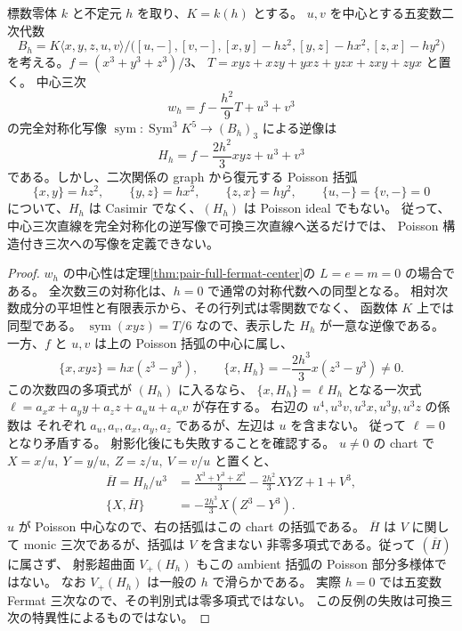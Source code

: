 \begin{proposition}[中心三次の対称化逆像は一般にPoisson超曲面を与えない]
\label{prop:poisson-naive-symmetrization-fails}
標数零体 $k$ と不定元 $h$ を取り、$K=k(h)$ とする。
$u,v$ を中心とする五変数二次代数
\[
 B_h=K\langle x,y,z,u,v\rangle/
 \bigl([u,-],[v,-],[x,y]-hz^2,[y,z]-hx^2,[z,x]-hy^2\bigr)
\]
を考える。$f=(x^3+y^3+z^3)/3$、
$T=xyz+xzy+yxz+yzx+zxy+zyx$ と置く。
中心三次
\[
 w_h=f-\frac{h^2}{9}T+u^3+v^3
\]
の完全対称化写像 $\operatorname{sym}:\operatorname{Sym}^3K^5\to(B_h)_3$
による逆像は
\[
 H_h=f-\frac{2h^2}{3}xyz+u^3+v^3
\]
である。しかし、二次関係の graph から復元する Poisson 括弧
\[
 \{x,y\}=hz^2,\qquad\{y,z\}=hx^2,\qquad\{z,x\}=hy^2,
 \qquad\{u,-\}=\{v,-\}=0
\]
について、$H_h$ は Casimir でなく、$(H_h)$ は Poisson ideal でもない。
従って、中心三次直線を完全対称化の逆写像で可換三次直線へ送るだけでは、
Poisson 構造付き三次への写像を定義できない。
\end{proposition}
\begin{proof}
$w_h$ の中心性は定理\ref{thm:pair-full-fermat-center}の
$L=e=m=0$ の場合である。
全次数三の対称化は、$h=0$ で通常の対称代数への同型となる。
相対次数成分の平坦性と有限表示から、その行列式は零関数でなく、
函数体 $K$ 上では同型である。
$\operatorname{sym}(xyz)=T/6$ なので、表示した $H_h$ が一意な逆像である。
一方、$f$ と $u,v$ は上の Poisson 括弧の中心に属し、
\[
 \{x,xyz\}=h x(z^3-y^3),
 \qquad
 \{x,H_h\}=-\frac{2h^3}{3}x(z^3-y^3)\ne0.
\]
この次数四の多項式が $(H_h)$ に入るなら、
$\{x,H_h\}=\ell H_h$ となる一次式
$\ell=a_xx+a_yy+a_zz+a_uu+a_vv$ が存在する。
右辺の $u^4,u^3v,u^3x,u^3y,u^3z$ の係数は
それぞれ $a_u,a_v,a_x,a_y,a_z$ であるが、左辺は $u$ を含まない。
従って $\ell=0$ となり矛盾する。
射影化後にも失敗することを確認する。
$u\ne0$ の chart で
$X=x/u,\ Y=y/u,\ Z=z/u,\ V=v/u$ と置くと、
\[
 \begin{aligned}
 \overline H=H_h/u^3
 &=\frac{X^3+Y^3+Z^3}{3}-\frac{2h^2}{3}XYZ+1+V^3,\\
 \{X,\overline H\}&=-\frac{2h^3}{3}X(Z^3-Y^3).
 \end{aligned}
\]
$u$ が Poisson 中心なので、右の括弧はこの chart の括弧である。
$\overline H$ は $V$ に関して monic 三次であるが、括弧は $V$ を含まない
非零多項式である。従って $(\overline H)$ に属さず、
射影超曲面 $V_+(H_h)$ もこの ambient 括弧の Poisson 部分多様体ではない。
なお $V_+(H_h)$ は一般の $h$ で滑らかである。
実際 $h=0$ では五変数 Fermat 三次なので、その判別式は零多項式ではない。
この反例の失敗は可換三次の特異性によるものではない。
\end{proof}

